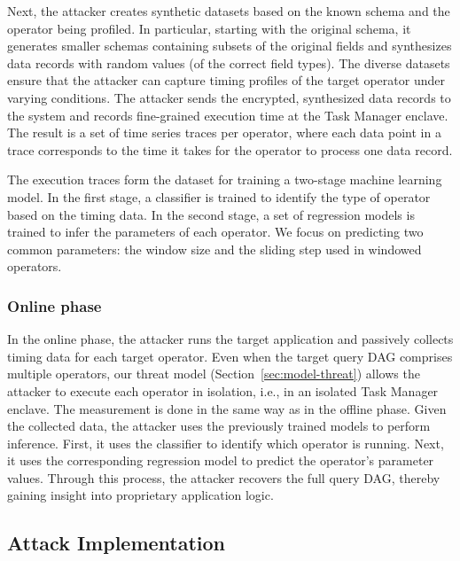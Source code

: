 Next, the attacker creates synthetic datasets based on the known schema and the operator being profiled. In particular,
starting with the original schema, it generates smaller schemas containing subsets of the original fields and synthesizes data records with random values (of the correct field types). The diverse datasets ensure that the attacker
can capture timing profiles of the target operator under varying conditions. The attacker sends the encrypted,
synthesized data records to the system and records fine-grained execution time at the Task Manager enclave. The result is a set of time series traces per operator, where each data point in a trace corresponds to the time it takes
for the operator to process one data record.   

The execution traces form the dataset for training a two-stage machine learning model. In the first stage, a classifier
is trained to identify the type of operator based on the timing data. In the second stage, a set of regression models is
trained to infer the parameters of each operator. We focus on predicting two common parameters: the window size and the
sliding step used in windowed operators.

\subsubsection*{Online phase} 
In the online phase, the attacker runs the target application and passively collects timing data for each target operator. Even when the target query DAG comprises multiple operators, our threat model (Section~\ref{sec:model-threat}) allows the attacker to execute each operator in isolation, i.e., in an isolated Task Manager enclave. The measurement is done in the same way as in the offline phase. Given the collected data, the attacker uses the previously trained models to perform inference. First, it uses the classifier to identify which operator is running. Next, it uses the corresponding regression model to predict the operator's parameter values. Through this process, the attacker recovers the full query
DAG, thereby gaining insight into proprietary application logic.



\subsection{Attack Implementation}
